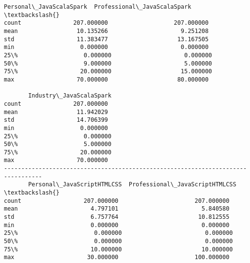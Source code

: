 \documentclass[11pt]{article}
\begin{document}
    \begin{Verbatim}[commandchars=\\\{\}]
       Personal\_JavaScalaSpark  Professional\_JavaScalaSpark  \textbackslash{}
count               207.000000                   207.000000   
mean                 10.135266                     9.251208   
std                  11.383477                    13.167505   
min                   0.000000                     0.000000   
25\%                   0.000000                     0.000000   
50\%                   9.000000                     5.000000   
75\%                  20.000000                    15.000000   
max                  70.000000                    80.000000   

       Industry\_JavaScalaSpark  
count               207.000000  
mean                 11.942029  
std                  14.706399  
min                   0.000000  
25\%                   0.000000  
50\%                   5.000000  
75\%                  20.000000  
max                  70.000000  
---------------------------------------------------------------------------------
       Personal\_JavaScriptHTMLCSS  Professional\_JavaScriptHTMLCSS  \textbackslash{}
count                  207.000000                      207.000000   
mean                     4.797101                        5.840580   
std                      6.757764                       10.812555   
min                      0.000000                        0.000000   
25\%                      0.000000                        0.000000   
50\%                      0.000000                        0.000000   
75\%                     10.000000                       10.000000   
max                     30.000000                      100.000000   


\end{Verbatim}
\end{document}
